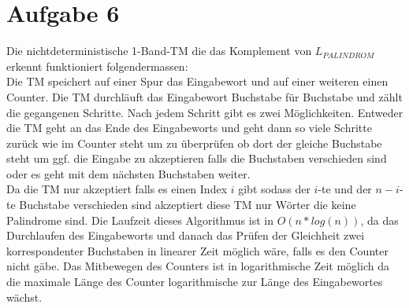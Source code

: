 \documentclass[a4paper,11pt]{scrartcl}
\begin{document}
	
	\section*{Aufgabe 6}
		Die nichtdeterministische 1-Band-TM die das Komplement von $L_{PALINDROM}$ erkennt funktioniert folgendermassen:\\
		Die TM speichert auf einer Spur das Eingabewort und auf einer weiteren einen Counter. Die TM durchläuft das Eingabewort Buchstabe für Buchstabe und zählt die gegangenen Schritte. Nach jedem Schritt gibt es zwei Möglichkeiten. Entweder die TM geht an das Ende des Eingabeworts und geht dann so viele Schritte zurück wie im Counter steht um zu überprüfen ob dort der gleiche Buchstabe steht um ggf. die Eingabe zu akzeptieren falls die Buchstaben verschieden sind oder es geht mit dem nächsten Buchstaben weiter.\\
		Da die TM nur akzeptiert falls es einen Index $i$ gibt sodass der $i$-te und der $n-i$-te Buchstabe verschieden sind akzeptiert diese TM nur Wörter die keine Palindrome sind.
		Die Laufzeit dieses Algorithmus ist in $O(n*log(n))$, da das Durchlaufen des Eingabeworts und danach das Prüfen der Gleichheit zwei korrespondenter Buchstaben in linearer Zeit möglich wäre, falls es den Counter nicht gäbe. Das Mitbewegen des Counters ist in logarithmische Zeit möglich da die maximale Länge des Counter logarithmische zur Länge des Eingabewortes wächst.
	
\end{document}
